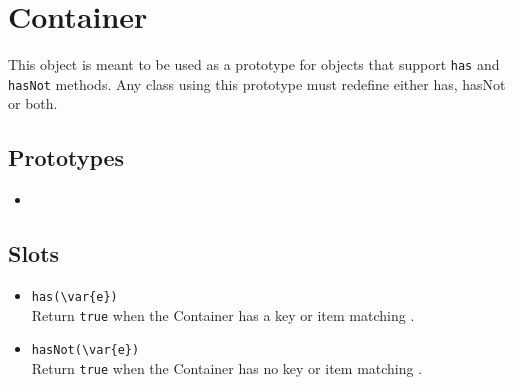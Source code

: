 
\section{Container}

This object is meant to be used as a prototype for objects that
support \lstinline|has| and \lstinline|hasNot| methods.
Any class using this prototype must redefine either has, hasNot or both.

\subsection{Prototypes}

\begin{itemize}
\item {}
\end{itemize}

\subsection{Slots}

\begin{itemize}
\item \lstinline|has(\var{e})|\\
  Return \lstinline|true| when the Container has a key or item matching
  .
\item \lstinline|hasNot(\var{e})|\\
  Return \lstinline|true| when the Container has no key or item matching
  .
\end{itemize}

